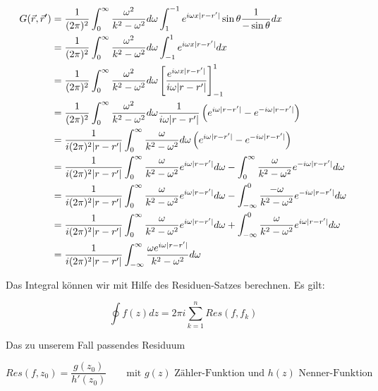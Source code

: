 \begin{align}
  \label{eq:28}
   G(\vec r ,\vec r')&= \frac{1}{(2\pi)^2} \int_0^{\infty} \frac{\omega^2}{k^2 - \omega^2 }  d\omega  \int_1^{-1} e^{i\omega x |r-r'| }  \sin\theta \frac{1}{-\sin\theta}  dx \notag\\
 &= \frac{1}{(2\pi)^2} \int_0^{\infty} \frac{\omega^2}{k^2 -\omega^2 }  d\omega  \int_{-1}^{1} e^{i\omega x |r-r'| }   dx \notag\\
&= \frac{1}{(2\pi)^2} \int_0^{\infty} \frac{\omega^2}{k^2 -\omega^2 }  d\omega \left[ \frac{ e^{i\omega x |r-r'| }}{i\omega |r-r'|  }   \right]_{-1}^{1}\notag \\
&= \frac{1}{(2\pi)^2} \int_0^{\infty} \frac{\omega^2}{k^2 -\omega^2 }  d\omega  \frac{1}{i\omega |r-r'|  }  \left( e^{i\omega |r-r'| }- e^{-i\omega |r-r'| } \right)\notag \\
&=  \frac{1}{i (2\pi)^2 |r-r'|  } \int_0^{\infty} \frac{\omega}{k^2 -\omega^2 }  d\omega   \left( e^{i\omega |r-r'| }- e^{-i\omega |r-r'| } \right)\notag \\
&=  \frac{1}{i (2\pi)^2 |r-r'|  } \int_0^{\infty} \frac{\omega}{k^2 -\omega^2 }   e^{i\omega |r-r'| } d\omega - \int_0^{\infty} \frac{\omega}{k^2 -\omega^2 }  e^{-i\omega |r-r'| }d\omega  \notag\\
&=  \frac{1}{i (2\pi)^2 |r-r'|  } \int_0^{\infty} \frac{\omega}{k^2 -\omega^2 }   e^{i\omega |r-r'| } d\omega - \int^0_{-\infty} \frac{-\omega}{k^2 -\omega^2 }  e^{-i\omega |r-r'| }d\omega \notag \\
&=  \frac{1}{i (2\pi)^2 |r-r'|  } \int_0^{\infty} \frac{\omega}{k^2 -\omega^2 }   e^{i\omega |r-r'| } d\omega + \int^0_{-\infty} \frac{\omega}{k^2 -\omega^2 }  e^{i\omega |r-r'| }d\omega \notag \\
&=  \frac{1}{i (2\pi)^2 |r-r'|  } \int_{-\infty}^{\infty} \frac{\omega e^{i\omega |r-r'| } }{k^2 -\omega^2 }  d\omega  
\end{align}


Das Integral können wir mit Hilfe des Residuen-Satzes berechnen. Es gilt:

\begin{equation}
  \label{eq:29}
  \oint f(z) dz = 2\pi i\sum_{k=1}^n Res(f,f_k)
\end{equation}

Das zu unserem Fall passendes Residuum

\begin{equation}
  \label{eq:30}
  Res(f,z_0) = \frac{g(z_0)}{h'(z_0)} \qquad \text{mit } g(z) \text{ Zähler-Funktion und } h(z) \text{ Nenner-Funktion} 
\end{equation}

